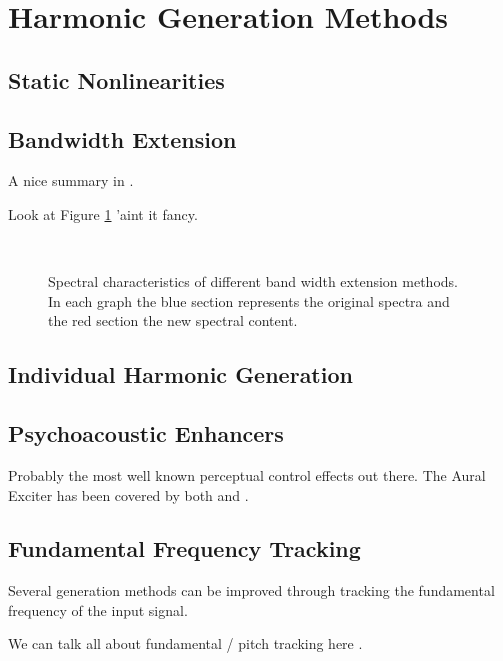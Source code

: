 \section{Harmonic Generation Methods}
\label{sec:Excitation-Methods}

	\subsection{Static Nonlinearities}
	\label{sec:Excitation-Statics}

	\subsection{Bandwidth Extension}
	\label{sec:Excitation-BWE}
		\note
		{
			A nice summary in \citet{larsen2004audio}.

			Look at Figure \ref{fig:SpectralFolding} 'aint it fancy.
		}

		\begin{figure}[h!]
			\centering
			\\
			\caption{Spectral characteristics of different band width extension methods. In each graph the blue section represents the original spectra and the red section the new spectral content.}
			\label{fig:SpectralFolding}
		\end{figure}

	\subsection{Individual Harmonic Generation}
	\label{sec:Excitation-Individuals}

	\subsection{Psychoacoustic Enhancers}
	\label{sec:Excitation-Enhancers}
		\note
		{
			Probably the most well known perceptual control effects out there. The Aural Exciter has been covered by both \citet{chalupper2000aural} and \citet{shekar2013modeling}.
		}

	\subsection{Fundamental Frequency Tracking}
	\label{sec:Excitation-Fundamental}
		\note
		{
			Several generation methods can be improved through tracking the fundamental frequency of the input signal.

			We can talk all about fundamental / pitch tracking here \citep{cuadra2001efficient, gerhard2003pitch, prukkanon2009vt-amdf, larsen2004audio}.
		}
